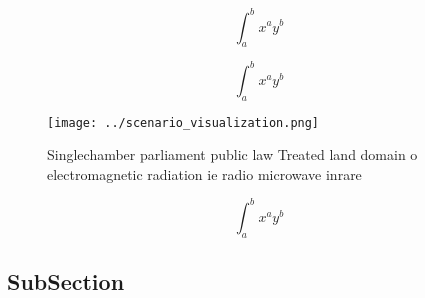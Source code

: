 \documentclass[a4paper]{article}
\begin{document}
\[ \int_{a}^{b}{x^{a}y^{b}} \]

\[ \int_{a}^{b}{x^{a}y^{b}} \]

\begin{figure}
\centering
\texttt{[image: ../scenario\_visualization.png]}
\caption{Singlechamber parliament public law Treated land domain o electromagnetic radiation ie radio microwave inrare
}
\end{figure}
 
\[ \int_{a}^{b}{x^{a}y^{b}} \]

\subsection{SubSection}
\end{document}
